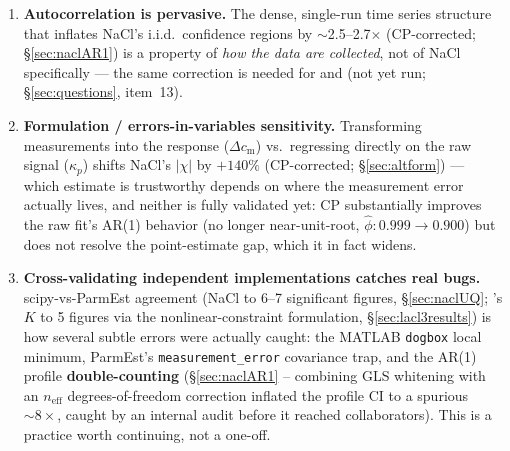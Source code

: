 \documentclass[11pt]{article}
\newcommand{\dstar}{\delta^{*}}
\begin{document}
\begin{enumerate}[itemsep=3pt]
        conclusions (clean $1{:}1$; adsorption-driven $2{:}1$/$3{:}1$) are
        robust even while the absolute parameter conventions await group
        consensus. \emph{Caveat on the word ``adsorption'':} the lumped $\dstar$/$K$
        also hides all solution/membrane \emph{non-ideality} ($\gamma_i\ne1$) and
        dielectric exclusion, both of which scale as $z_i^2$ and would produce the
        same $2{:}1$/$3{:}1$ signature without any specific adsorption ---
        a leading alternative hypothesis (activity coefficients, TJ's work) laid out
        as a future extension in \S\ref{sec:partition}.
  \item \textbf{Autocorrelation is pervasive.} The dense, single-run time
        series structure that inflates NaCl's i.i.d.\ confidence regions by
        $\sim$2.5--2.7$\times$ (CP-corrected; \S\ref{sec:naclAR1}) is a
        property of
        \emph{how the data are collected}, not of NaCl specifically --- the
        same correction is needed for  and  (not yet
        run; \S\ref{sec:questions}, item~13).
  \item \textbf{Formulation / errors-in-variables sensitivity.} Transforming
        measurements into the response ($\Delta c_{\mathrm m}$) vs.\
        regressing directly on the raw signal ($\kappa_p$) shifts NaCl's
        $|\chi|$ by $+140\%$ (CP-corrected; \S\ref{sec:altform}) --- which
        estimate is
        trustworthy depends on where the measurement error actually lives,
        and neither is fully validated yet: CP substantially improves the
        raw fit's AR(1) behavior (no longer near-unit-root, $\hat\phi:
        0.999\to0.900$) but does not resolve the point-estimate gap, which
        it in fact widens.
  \item \textbf{Cross-validating independent implementations catches real
        bugs.} scipy-vs-ParmEst agreement (NaCl to 6--7 significant figures,
        \S\ref{sec:naclUQ}; \ce{LaCl3}'s $K$ to 5 figures via the
        nonlinear-constraint formulation, \S\ref{sec:lacl3results}) is how
        several subtle errors were actually caught: the MATLAB
        \texttt{dogbox} local minimum, ParmEst's \texttt{measurement\_error}
        covariance trap, and the AR(1) profile
        \textbf{double-counting} (\S\ref{sec:naclAR1} -- combining GLS
        whitening with an $n_{\mathrm{eff}}$ degrees-of-freedom correction
        inflated the profile CI to a spurious $\sim\!8\times$, caught by an
        internal audit before it reached collaborators). This is a practice
        worth continuing, not a one-off.
\end{enumerate}
\end{document}
